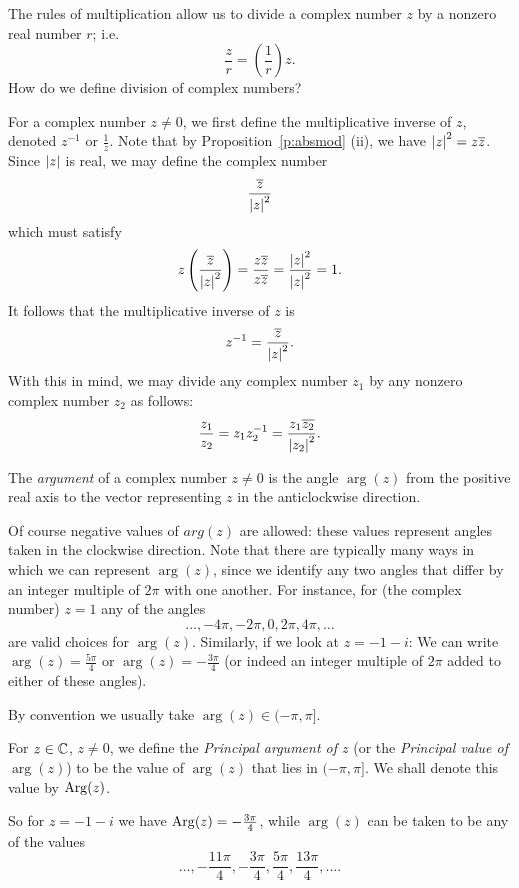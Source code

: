 \begin{question}
The rules of multiplication allow us to divide a complex number $z$ by a nonzero real number $r$; i.e.
\[
\frac{z}{r} = \left( \frac{1}{r} \right) z.
\]
How do we define division of complex numbers?
\end{question}
\begin{answer}
For a complex number $z \neq 0$, we first define the multiplicative inverse of $z$, denoted $z^{-1}$ or $\frac{1}{z}$.  Note that  by Proposition~\ref{p:absmod} (ii), we have $\left| z \right|^2 = z \overline{z}$.  Since $\left| z \right|$ is real, we may  define the complex number
\[
\frac{\overline{z}}{\left| z \right|^2}
\]
which must satisfy
\[
z \left(  \frac{\overline{z}}{\left| z \right|^2}  \right) = \frac{z \overline{z}}{z \overline{z}} = \frac{\left| z \right|^2}{\left| z \right|^2} = 1.
\]
It follows that the multiplicative inverse of $z$ is
\[
z^{-1} = \frac{\overline{z}}{\left| z \right|^2}.
\]
With this in mind, we may divide any complex number $z_1$ by any nonzero complex number $z_2$ as follows:
\[
\frac{z_1}{z_2} = z_1 z_2^{-1} = \frac{z_1\overline{z_2}}{\left| z_2 \right|^2}.
\]
\end{answer}

\begin{definition}[Argument]
The \emph{argument} of a complex number $z \neq 0$ is the angle $\arg (z)$ from the positive real axis to the vector representing $z$ in the anticlockwise direction.  
\end{definition}
Of course negative values of $arg(z)$ are allowed: these values represent angles taken in the clockwise direction.  Note that there are typically many ways in which we can represent $\arg (z)$, since we identify any two angles that differ by an integer multiple of $2\pi$ with one another.  For instance, for (the complex number) $z=1$ any of the angles
\[
\ldots,-4\pi, -2\pi, 0, 2 \pi , 4\pi,\ldots
\]
are valid choices for $\arg (z)$.   Similarly, if we look at $z=-1-i$:
We can write $\arg (z) = \frac{5\pi}{4}$ or $\arg (z)=- \frac{3\pi}{4}$ (or indeed an integer multiple of $2\pi$ added to either of these angles).




By convention we usually take $\arg (z) \in (-\pi , \pi]$.
\begin{definition}
For $z \in \mathbb{C}$, $z \neq 0$, we define the \emph{Principal argument of $z$} (or the \emph{Principal value of $\arg(z)$}) to be the value of $\arg (z)$ that lies in $(-\pi,\pi]$. We shall denote this value by $\mathrm{Arg} (z)$.
\end{definition}
So for $z=-1-i$ we have $\mathrm{Arg} (z) = - \frac{3 \pi}{4}$, while $\arg (z)$ can be taken to be any of the values
\[
\ldots, - \frac{11\pi}{4}, - \frac{3\pi}{4}, \frac{5\pi}{4}, \frac{13\pi}{4}, \ldots.
\]


